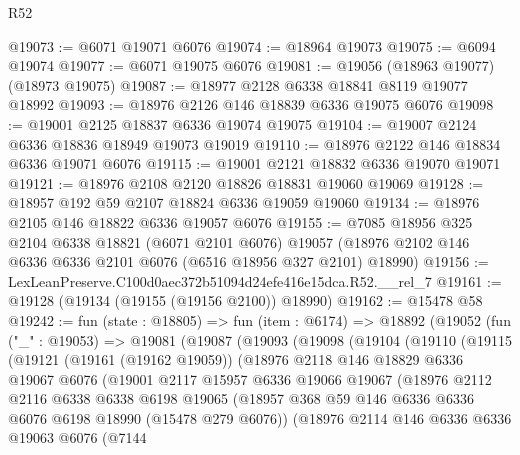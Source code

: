 \begin{lexlean}{R52}
\begin{coremodule}
@19073 := @6071 @19071 @6076
@19074 := @18964 @19073
@19075 := @6094 @19074
@19077 := @6071 @19075 @6076
@19081 := @19056 (@18963 @19077) (@18973 @19075)
@19087 := @18977 @2128 @6338 @18841 @8119 @19077 @18992
@19093 := @18976 @2126 @146 @18839 @6336 @19075 @6076
@19098 := @19001 @2125 @18837 @6336 @19074 @19075
@19104 := @19007 @2124 @6336 @18836 @18949 @19073 @19019
@19110 := @18976 @2122 @146 @18834 @6336 @19071 @6076
@19115 := @19001 @2121 @18832 @6336 @19070 @19071
@19121 := @18976 @2108 @2120 @18826 @18831 @19060 @19069
@19128 := @18957 @192 @59 @2107 @18824 @6336 @19059 @19060
@19134 := @18976 @2105 @146 @18822 @6336 @19057 @6076
@19155 := @7085
    @18956
    @325
    @2104
    @6338
    @18821
    (@6071 @2101 @6076)
    @19057
    (@18976 @2102 @146 @6336 @6336 @2101 @6076 (@6516 @18956 @327 @2101) @18990)
@19156 := LexLeanPreserve.C100d0aec372b51094d24efe416e15dca.R52.__rel_7
@19161 := @19128 (@19134 (@19155 (@19156 @2100)) @18990)
@19162 := @15478 @58
@19242 := fun (state : @18805) =>
  fun (item : @6174) =>
  @18892
    (@19052
      (fun ("_" : @19053) =>
      @19081
        (@19087
          (@19093
            (@19098
              (@19104
                (@19110
                  (@19115
                    (@19121
                      (@19161 (@19162 @19059))
                      (@18976
                        @2118
                        @146
                        @18829
                        @6336
                        @19067
                        @6076
                        (@19001
                          @2117
                          @15957
                          @6336
                          @19066
                          @19067
                          (@18976
                            @2112
                            @2116
                            @6338
                            @6338
                            @6198
                            @19065
                            (@18957
                              @368
                              @59
                              @146
                              @6336
                              @6336
                              @6076
                              @6198
                              @18990
                              (@15478 @279 @6076))
                            (@18976
                              @2114
                              @146
                              @6336
                              @6336
                              @19063
                              @6076
                              (@7144

\end{coremodule}
\end{lexlean}
